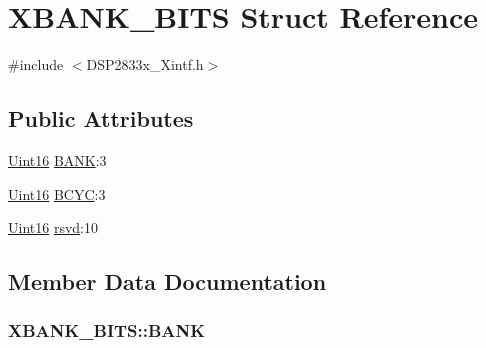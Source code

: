 \hypertarget{struct_x_b_a_n_k___b_i_t_s}{}\section{X\+B\+A\+N\+K\+\_\+\+B\+I\+T\+S Struct Reference}
\label{struct_x_b_a_n_k___b_i_t_s}


{\ttfamily \#include $<$D\+S\+P2833x\+\_\+\+Xintf.\+h$>$}

\subsection*{Public Attributes}
\begin{DoxyCompactItemize}
\item 
\hyperlink{_d_s_p2833x___device_8h_a59a9f6be4562c327cbfb4f7e8e18f08b}{Uint16} \hyperlink{struct_x_b_a_n_k___b_i_t_s_a1df79af9d7a12059c747dac5c64183b5}{B\+A\+N\+K}\+:3
\item 
\hyperlink{_d_s_p2833x___device_8h_a59a9f6be4562c327cbfb4f7e8e18f08b}{Uint16} \hyperlink{struct_x_b_a_n_k___b_i_t_s_a58b19085c8c651e658a81ac78382007e}{B\+C\+Y\+C}\+:3
\item 
\hyperlink{_d_s_p2833x___device_8h_a59a9f6be4562c327cbfb4f7e8e18f08b}{Uint16} \hyperlink{struct_x_b_a_n_k___b_i_t_s_a4a99af7871b2c81857440e1c414f3247}{rsvd}\+:10
\end{DoxyCompactItemize}


\subsection{Member Data Documentation}
\hypertarget{struct_x_b_a_n_k___b_i_t_s_a1df79af9d7a12059c747dac5c64183b5}{}
\subsubsection[{B\+A\+N\+K}]{ X\+B\+A\+N\+K\+\_\+\+B\+I\+T\+S\+::\+B\+A\+N\+K}\label{struct_x_b_a_n_k___b_i_t_s_a1df79af9d7a12059c747dac5c64183b5}
\hypertarget{struct_x_b_a_n_k___b_i_t_s_a58b19085c8c651e658a81ac78382007e}{}

